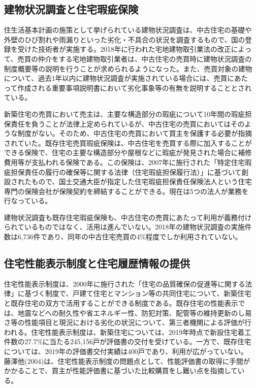 \documentclass[a4paper,fontsize=11pt,report,notitlepage,line_length=38zw,number_of_lines=40,dvipdfmx]{jlreq}
\begin{document}
\subsection{建物状況調査と住宅瑕疵保険}
住生活基本計画の施策として挙げられている建物状況調査は、中古住宅の基礎や外壁のひび割れや雨漏りといった劣化・不具合の状況を調査するもので、国の登録を受けた技術者が実施する。2018年に行われた宅地建物取引業法の改正によって、売買の仲介をする宅地建物取引業者は、中古住宅の売買時に建物状況調査の制度概要等の説明を行うことが求められるようになった。また、売買対象の建物について、過去1年以内に建物状況調査が実施されている場合には、売買にあたって作成される重要事項説明書において劣化事象等の有無を説明することとされている\cite{takuchitatemono}。

新築住宅の売買において売主は、主要な構造部分の瑕疵について10年間の瑕疵担保責任を負うことが法律上定められているが、中古住宅の売買においてはそのような制度がない。そのため、中古住宅の売買において買主を保護する必要が指摘されていた。既存住宅売買瑕疵保険は、中古住宅を売買する際に加入することができる保険で、住宅の主要な構造部分や屋根などに瑕疵が発見された場合に補修費用等が支払われる保険である。この保険は、2007年に施行された「特定住宅瑕疵担保責任の履行の確保等に関する法律（住宅瑕疵担保履行法）」に基づいて創設されたもので、国土交通大臣が指定した住宅瑕疵担保責任保険法人という住宅専門の保険会社が保険契約を締結することができる。現在は5つの法人が業務を行なっている。

建物状況調査も既存住宅瑕疵保険も、中古住宅の売買にあたって利用が義務付けられているものではなく、活用は進んでいない。2018年の建物状況調査の実施件数は6,736件\cite{questionnaire}であり、同年の中古住宅売買の4\%程度でしか利用されていない。

\subsection{住宅性能表示制度と住宅履歴情報の提供}
住宅性能表示制度は、2000年に施行された「住宅の品質確保の促進等に関する法律」に基づく制度で、戸建て住宅とマンション等の共同住宅について、新築住宅と既存住宅の双方で活用することができる制度である。既存住宅の性能表示では、地震などへの耐久性や省エネルギー性、防犯対策、配管等の維持更新のし易さ等の性能項目と現況における劣化の状況について、第三者機関による評価が行われる。住宅性能表示制度は、新築住宅については、2019年時点で新設住宅着工件数の27.7\%に当たる245,156戸が評価書の交付を受けている。一方で、既存住宅については、2019年の評価書交付実績は400戸であり、利用が広がっていない\cite{jutakuseino}。藤澤他(2004)\cite{fujisawa2004}は、住宅性能表示制度の問題点として、性能評価書の取得に手間がかかることで、買主が性能評価書に基づいた比較購買をし難い点を指摘している。
\end{document}
